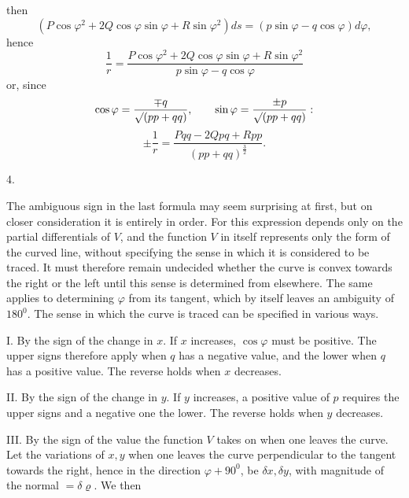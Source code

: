 %
\noindent then
\[
(P\cos\varphi^2+2Q\cos\varphi\sin\varphi+R\sin\varphi^2)ds=(p\sin\varphi-q\cos\varphi)d\varphi,
\]
hence
\[
\frac1r=\frac{P\cos\varphi^2+2Q\cos\varphi\sin\varphi+R\sin\varphi^2}{p\sin\varphi-q\cos\varphi}
\]
or, since
\[
\cos\varphi=\frac{\mp q}{\mathord{\surd}(pp+qq)},\qquad\sin\varphi=\frac{\pm p}{\mathord{\surd}(pp+qq)}:
\]
\[
\pm\frac1r=\frac{Pqq-2Qpq+Rpp}{(pp+qq)^{\frac32}}.
\]

\begin{center}4.\end{center}
\noindent\hspace*{1.2em}The ambiguous sign in the last formula may seem surprising at first, but on closer consideration it is entirely in order. For this expression depends only on the partial differentials of $V$, and the function $V$ in itself represents only the form of the curved line, without specifying the sense in which it is considered to be traced. It must therefore remain undecided whether the curve is convex towards the right or the left until this sense is determined from elsewhere. The same applies to determining $\varphi$ from its tangent, which by itself leaves an ambiguity of $180^{0}$. The sense in which the curve is traced can be specified in various ways.

I. By the sign of the change in $x$. If $x$ increases, $\cos\varphi$ must be positive. The upper signs therefore apply when $q$ has a negative value, and the lower when $q$ has a positive value. The reverse holds when $x$ decreases.

II. By the sign of the change in $y$. If $y$ increases, a positive value of $p$ requires the upper signs and a negative one the lower. The reverse holds when $y$ decreases.

III. By the sign of the value the function $V$ takes on when one leaves the curve. Let the variations of $x,y$ when one leaves the curve perpendicular to the tangent towards the right, hence in the direction $\varphi+90^{0}$, be $\delta x,\delta y$, with magnitude of the normal $=\delta\varrho$. We then\space%

